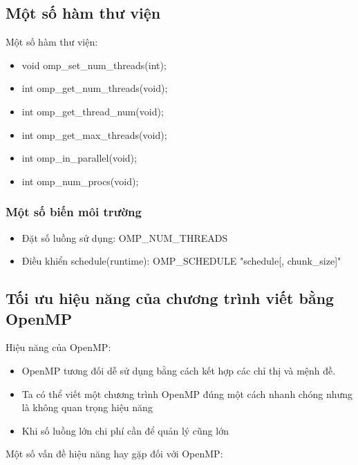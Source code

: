 \documentclass[14pt, a4paper]{article}
\numberwithin{equation}{section}
\numberwithin{figure}{section}
\numberwithin{dl}{section}
\numberwithin{md}{section}
\numberwithin{bd}{section}
\numberwithin{dn}{section}
\numberwithin{hq}{section}
\begin{document}
\subsection{Một số hàm thư viện}

Một số hàm thư viện:

\begin{itemize}
    \item void omp\_set\_num\_threads(int);
    \item int omp\_get\_num\_threads(void);
    \item int omp\_get\_thread\_num(void);
    \item int omp\_get\_max\_threads(void);
    \item int omp\_in\_parallel(void);
    \item int omp\_num\_procs(void);	

\end{itemize}

\subsubsection{Một số biến môi trường}

\begin{itemize}
    \item Đặt số luồng sử dụng: OMP\_NUM\_THREADS
    \item Điều khiển schedule(runtime): OMP\_SCHEDULE "schedule[, chunk\_size]"
\end{itemize}

\subsection{Tối ưu hiệu năng của chương trình viết bằng OpenMP}

Hiệu năng của OpenMP:

\begin{itemize}
    \item OpenMP tương đối dễ sử dụng bằng cách kết hợp các chỉ thị và mệnh đề.
    \item Ta có thể viết một chương trình OpenMP đúng một cách nhanh chóng nhưng là không quan trọng hiệu năng
    \item Khi số luồng lớn chi phí cần để quản lý cũng lớn
\end{itemize}

Một số vấn đề hiệu năng hay gặp đối với OpenMP:
\end{document}
